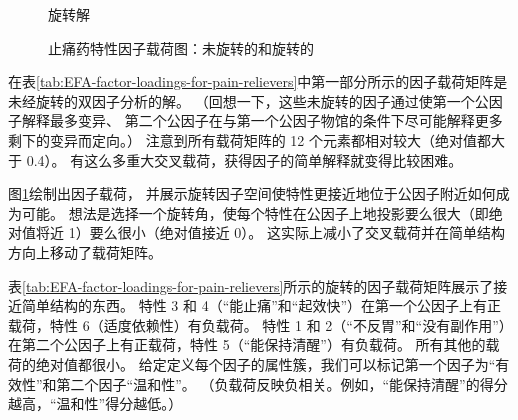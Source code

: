 \begin{figure}[htb]
\begin{floatrow}
{\begin{subfloatrow}
{
                }{\caption{旋转解}}   
            \end{subfloatrow}
        }{
            \caption{止痛药特性因子载荷图：未旋转的和旋转的}
            \label{fig:EFA-plot-of-factor-loadings-for-attributes-of-pain-relievers}
        }
    \end{floatrow}
\end{figure}

在表\ref{tab:EFA-factor-loadings-for-pain-relievers}中第一部分所示的因子载荷矩阵是未经旋转的双因子分析的解。
（回想一下，这些未旋转的因子通过使第一个公因子解释最多变异、
第二个公因子在与第一个公因子物馆的条件下尽可能解释更多剩下的变异而定向。）
注意到所有载荷矩阵的 12 个元素都相对较大（绝对值都大于 0.4）。
有这么多重大交叉载荷，获得因子的简单解释就变得比较困难。

图\ref{fig:EFA-plot-of-factor-loadings-for-attributes-of-pain-relievers}绘制出因子载荷，
并展示旋转因子空间使特性更接近地位于公因子附近如何成为可能。
想法是选择一个旋转角，使每个特性在公因子上地投影要么很大（即绝对值将近 1）要么很小（绝对值接近 0）。
这实际上减小了交叉载荷并在简单结构方向上移动了载荷矩阵。

表\ref{tab:EFA-factor-loadings-for-pain-relievers}所示的旋转的因子载荷矩阵展示了接近简单结构的东西。
特性 3 和 4（“能止痛”和“起效快”）在第一个公因子上有正载荷，特性 6（适度依赖性）有负载荷。
特性 1 和 2（“不反胃”和“没有副作用”）在第二个公因子上有正载荷，特性 5（“能保持清醒”）有负载荷。
所有其他的载荷的绝对值都很小。
给定定义每个因子的属性簇，我们可以标记第一个因子为“有效性”和第二个因子“温和性”。
（负载荷反映负相关。例如，“能保持清醒”的得分越高，“温和性”得分越低。）


